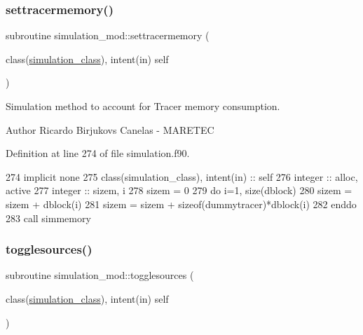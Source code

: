 \subsubsection{\texorpdfstring{settracermemory()}{settracermemory()}}
{\footnotesize\ttfamily subroutine simulation\+\_\+mod\+::settracermemory (\begin{DoxyParamCaption}\item[{class(\mbox{\hyperlink{structsimulation__mod_1_1simulation__class}{simulation\+\_\+class}}), intent(in)}]{self }\end{DoxyParamCaption})\hspace{0.3cm}{\ttfamily [private]}}



Simulation method to account for Tracer memory consumption. 

\begin{DoxyAuthor}{Author}
Ricardo Birjukovs Canelas -\/ M\+A\+R\+E\+T\+EC 
\end{DoxyAuthor}


Definition at line 274 of file simulation.\+f90.


\begin{DoxyCode}
274     \textcolor{keywordtype}{implicit none}
275     \textcolor{keywordtype}{class}(simulation\_class), \textcolor{keywordtype}{intent(in)} :: self
276     \textcolor{keywordtype}{integer} :: alloc, active
277     \textcolor{keywordtype}{integer} :: sizem, i
278     sizem = 0
279     \textcolor{keywordflow}{do} i=1, \textcolor{keyword}{size}(dblock)
280         sizem = sizem + dblock(i)%
281         sizem = sizem + sizeof(dummytracer)*dblock(i)%
282 \textcolor{keywordflow}{    enddo}  
283     \textcolor{keyword}{call }simmemory%
\end{DoxyCode}
\mbox{\label{namespacesimulation__mod_a87a5141e4516b9610a6e4f0d2ff2d719}} 
\subsubsection{\texorpdfstring{togglesources()}{togglesources()}}
{\footnotesize\ttfamily subroutine simulation\+\_\+mod\+::togglesources (\begin{DoxyParamCaption}\item[{class(\mbox{\hyperlink{structsimulation__mod_1_1simulation__class}{simulation\+\_\+class}}), intent(in)}]{self }\end{DoxyParamCaption})\hspace{0.3cm}{\ttfamily [private]}}



